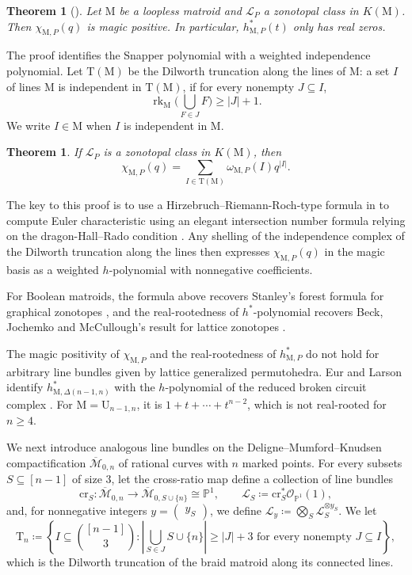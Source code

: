 \documentclass[11pt,a4paper,reqno]{amsart}
\theoremstyle{results}
\theoremstyle{definitions}
\def\P{\mathbb{P}}
\newcommand{\abs}[1]{\left\lvert#1\right\rvert}
\newcommand{\rk}{\operatorname{rk}}
\newcommand{\M}{\mathrm{M}}
\newtheorem{theorem}[thm]{Theorem}
\newcommand{\hstar}{h^{*}}
\newcommand{\cL}{\mathcal{L}}
\newcommand{\cO}{\mathcal{O}}
\newcommand{\DT}{\mathrm{T}}      %
\newcommand{\U}{\mathrm{U}}
\newcommand{\Mbar}{\overline{\mathcal M}}
\begin{document}
\begin{theorem}[]
  \label{thm:main}
  Let $\M$ be a loopless matroid and $\cL_P$ a zonotopal class in $K(\M)$.
  Then $\chi_{\M,P}(q)$ is magic positive. In particular,
  $\hstar_{\M,P}(t)$ only has real zeros. 
\end{theorem}

The proof identifies the Snapper polynomial with a weighted independence
polynomial. Let $\DT(\M)$ be the Dilworth truncation along the lines of $\M$:
a set $I$ of lines $\M$ is independent in $\DT(\M)$, if for every nonempty $J \subseteq I$,
\[
  \rk_{\M}\Big(\bigcup_{F\in J}F\Big) \geqslant |J| + 1. 
\]
We write $I \in \M$ when $I$ is independent in $\M$.

\begin{theorem}\label{thm:main-EC-independence}
  If $\cL_{P}$ is a zonotopal class in $K(\M)$, then 
  \[
    \chi_{\M,P}(q)=\sum_{I\in\DT(\M)}\omega_{\M, P}(I)q^{|I|}.
  \]
\end{theorem}

The key to this proof is to use a Hirzebruch--Riemann-Roch-type formula in \cite{larson2024k} to compute Euler characteristic using 
an elegant intersection number formula relying on the dragon-Hall--Rado condition \cite{backman2024simplicial}. 
Any shelling of the independence complex of the Dilworth truncation along the lines then expresses $\chi_{\M, P}(q)$ in the magic basis as a weighted $h$-polynomial with nonnegative coefficients.

For Boolean matroids, the formula above recovers Stanley's forest formula
for graphical zonotopes \cite{stanley1991zonotope}, and the real-rootedness of $h^{\ast}$-polynomial
recovers Beck, Jochemko and McCullough's
result for lattice zonotopes \cite{beck2019h}.

The magic positivity of $\chi_{\M, P}$ and the real-rootedness of $\hstar_{\M, P}$ do not hold for arbitrary line bundles given by lattice generalized permutohedra. Eur and
Larson identify $\hstar_{\M,\Delta(n-1,n)}$ with the $h$-polynomial of the
reduced broken circuit complex \cite[Example 5.8]{eur2023k}. For
$\M=\U_{n-1,n}$, it is $1+t+\cdots+t^{n-2}$, which is not real-rooted for
$n \geqslant 4$. 


We next introduce analogous line bundles on the Deligne--Mumford--Knudsen compactification $\Mbar_{0,n}$ of rational curves
with $n$ marked points. For every subsets $S \subseteq [n-1]$ of size $3$, let the cross-ratio map define a collection of line bundles
\[
  \textrm{cr}_S\colon\Mbar_{0,n}\longrightarrow
  \Mbar_{0,S\cup\{n\}}\cong\P^1,
  \qquad \cL_S\coloneqq \textrm{cr}_S^*\cO_{\P^1}(1),
\]
and, for nonnegative integers $y = \begin{pmatrix}y_S\end{pmatrix}$, we define 
$\cL_y \coloneqq \bigotimes_S\cL_S^{\otimes y_S}$. We let  
\[
  \DT_n \coloneqq \left\{I\subseteq\binom{[n-1]}3:
  \left|\bigcup_{S\in J}S \cup \{n\}\right| \geqslant \abs{J} + 3
  \text{ for every nonempty }J\subseteq I\right\}, 
\]
which is the Dilworth truncation of the braid matroid along its
connected lines.
\end{document}
